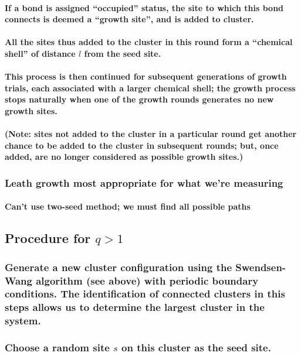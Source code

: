\documentclass{umthesis}
\begin{document}
\paragraph{If a bond is assigned ``occupied'' status, the site to which this bond connects is deemed a ``growth site'', and is added to cluster.}
\label{sec-3.2.2.2.2}
\paragraph{All the sites thus added to the cluster in this round form a ``chemical shell'' of distance $l$ from the seed site.}
\label{sec-3.2.2.2.3}
\paragraph{This process is then continued for subsequent generations of growth trials, each associated with a larger chemical shell; the growth process stops naturally when one of the growth rounds generates no new growth sites.}
\label{sec-3.2.2.2.4}
\paragraph{(Note: sites not added to the cluster in a particular round get another chance to be added to the cluster in subsequent rounds; but, once added, are no longer considered as possible growth sites.)}
\label{sec-3.2.2.2.5}
\subsubsection{Leath growth most appropriate for what we're measuring}
\label{sec-3.2.2.3}
\paragraph{Can't use two-seed method; we must find all possible paths}
\label{sec-3.2.2.3.1}
\subsection{Procedure for $q>1$}
\label{sec-3.2.3}
\subsubsection{Generate a new cluster configuration using the Swendsen-Wang algorithm (see above) with periodic boundary conditions. The identification of connected clusters in this steps allows us to determine the largest cluster in the system.}
\label{sec-3.2.3.1}
\subsubsection{Choose a random site $s$ on this cluster as the seed site.}
\label{sec-3.2.3.2}
\end{document}

